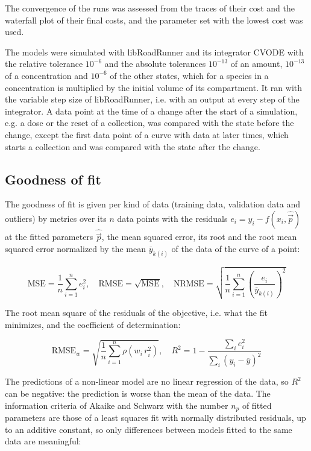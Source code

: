 The convergence of the runs was assessed from the traces of their cost and the waterfall plot of their final costs, and the parameter set with the lowest cost was used.

The models were simulated with libRoadRunner \cite{Welsh2023} and its integrator CVODE \cite{Hindmarsh2005} with the relative tolerance $10^{-6}$ and the absolute tolerances $10^{-13}$ of an amount, $10^{-13}$ of a concentration and $10^{-6}$ of the other states, which for a species in a concentration is multiplied by the initial volume of its compartment. It ran with the variable step size of libRoadRunner, i.e. with an output at every step of the integrator. A data point at the time of a change after the start of a simulation, e.g. a dose or the reset of a collection, was compared with the state before the change, except the first data point of a curve with data at later times, which starts a collection and was compared with the state after the change.

\subsection{Goodness of fit}

The goodness of fit is given per kind of data (training data, validation data and outliers) by metrics over its $n$ data points with the residuals $e_i = y_i - f(x_i, \hat{\vec{p}})$ at the fitted parameters $\hat{\vec{p}}$, the mean squared error, its root and the root mean squared error normalized by the mean $\overline{y}_{k(i)}$ of the data of the curve of a point:

\begin{equation}
\mathrm{MSE} = \frac{1}{n} \sum_{i=1}^{n} e_i^2, \quad \mathrm{RMSE} = \sqrt{\mathrm{MSE}}, \quad \mathrm{NRMSE} = \sqrt{\frac{1}{n} \sum_{i=1}^{n} \left(\frac{e_i}{\overline{y}_{k(i)}}\right)^2}
\end{equation}

The root mean square of the residuals of the objective, i.e. what the fit minimizes, and the coefficient of determination:

\begin{equation}
\mathrm{RMSE}_w = \sqrt{\frac{1}{n} \sum_{i=1}^{n} \rho\left(w_i\, r_i^2\right)}, \quad R^2 = 1 - \frac{\sum_{i} e_i^2}{\sum_{i} \left(y_i - \overline{y}\right)^2}
\end{equation}

The predictions of a non-linear model are no linear regression of the data, so $R^2$ can be negative: the prediction is worse than the mean of the data. The information criteria of Akaike \cite{Akaike1974} and Schwarz \cite{Schwarz1978} with the number $n_p$ of fitted parameters are those of a least squares fit with normally distributed residuals, up to an additive constant, so only differences between models fitted to the same data are meaningful:

